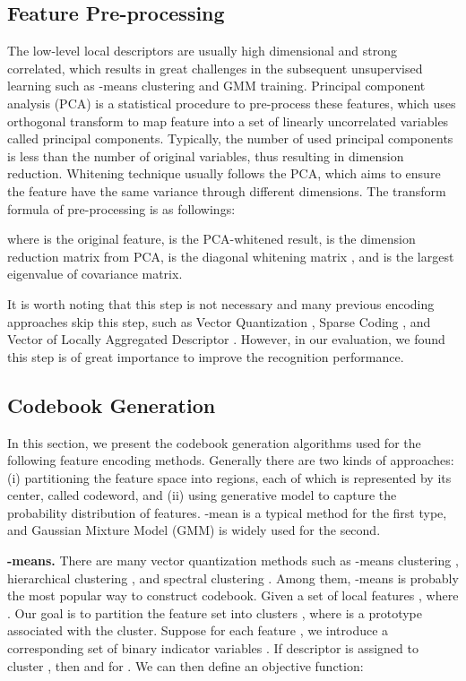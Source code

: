 \documentclass[twocolumn]{svjour3}          \smartqed  \usepackage{slashbox}
\begin{document}
\subsection{Feature Pre-processing}
The low-level local descriptors are usually high dimensional and strong correlated, which results in great challenges in the subsequent unsupervised learning such as -means clustering and GMM training. Principal component analysis (PCA) \cite{Bishop06} is a statistical procedure to pre-process these features, which uses orthogonal transform to map feature into a set of linearly uncorrelated variables called principal components. Typically, the number of used principal components is less than the number of original variables, thus resulting in dimension reduction. Whitening technique usually follows the PCA, which aims to ensure the feature have the same variance through different dimensions. The transform formula of pre-processing is as followings:

where  is the original feature,  is the PCA-whitened result,  is the dimension reduction matrix from PCA,  is the diagonal whitening matrix , and  is the  largest eigenvalue of covariance matrix.

It is worth noting that this step is not necessary and many previous encoding approaches skip this step, such as Vector Quantization \cite{SivicZ03}, Sparse Coding \cite{YangYGH09}, and Vector of Locally Aggregated Descriptor \cite{JegouPDSPS12}. However, in our evaluation, we found this step is of great importance to improve the recognition performance.

\subsection{Codebook Generation}
In this section, we present the codebook generation algorithms used for the following feature encoding methods. Generally there are two kinds of approaches: (i) partitioning the feature space into regions, each of which is represented by its center, called codeword, and (ii) using generative model to capture the probability distribution of features. -mean \cite{Bishop06} is a typical method for the first type, and Gaussian Mixture Model (GMM) \cite{Bishop06} is widely used for the second.

\textbf{-means.} There are many vector quantization methods  such as -means clustering \cite{Bishop06}, hierarchical clustering \cite{Johnson67}, and spectral clustering \cite{NgJW01}. Among them, -means is probably the most popular way to construct codebook. Given a set of local features , where . Our goal is to partition the feature set into  clusters , where  is a prototype associated with the  cluster. Suppose for each feature , we introduce a corresponding set of binary indicator variables . If descriptor  is assigned to cluster , then  and  for . We can then define an objective function:
\end{document}
